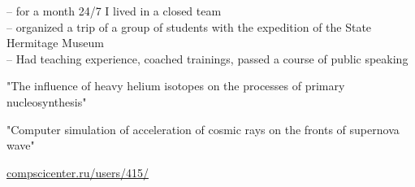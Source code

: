 \vspace{-1.5em}
\begin{multicols}{2}
 \givenskill

 \givenskill
\end{multicols}

    \cvtag{\LaTeX}

\divider


 -- for a month 24/7 I lived in a closed team\\[0.5em]
 -- organized a trip of a group of students with the expedition of the State Hermitage Museum\\[0.5em]
 -- Had teaching experience, coached trainings, passed a course of public speaking\\[0.5em]

"The influence of heavy helium isotopes on the processes of primary nucleosynthesis"

\vspace{0.5em}
"Computer simulation of acceleration of cosmic rays on the fronts of supernova wave"

\vspace{0.5em}
\href{https://compscicenter.ru/users/415/}{compscicenter.ru/users/415/}
